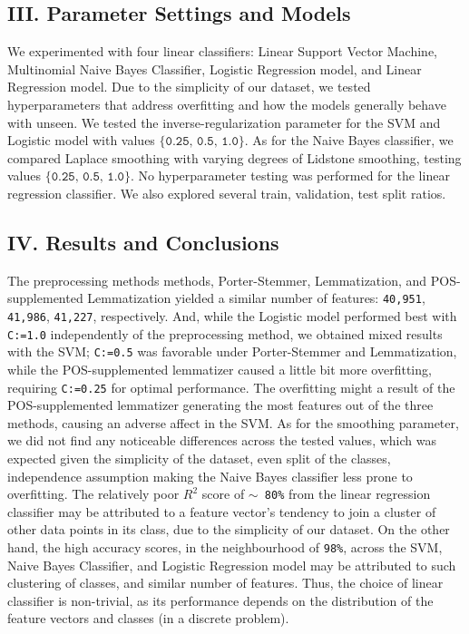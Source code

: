 \documentclass[11pt]{article}
\begin{document}
\subsection*{III. Parameter Settings and Models}
We experimented with four linear classifiers: 
Linear Support Vector Machine, 
Multinomial Naive Bayes Classifier, 
Logistic Regression model, 
and Linear Regression model. Due to the 
simplicity of our dataset, we tested hyperparameters
that address overfitting and
how the models generally behave with unseen.
We tested the inverse-regularization parameter
for the SVM and Logistic model with values $\{\texttt{0.25, 0.5, 1.0}\}$.
As for the Naive Bayes classifier, 
we compared Laplace smoothing 
with varying degrees of Lidstone smoothing,
testing values $\{\texttt{0.25, 0.5, 1.0}\}$. 
No hyperparameter testing was performed for the linear regression classifier.
We also explored several train, validation, test split ratios.

\subsection*{IV. Results and Conclusions}
The preprocessing methods methods, Porter-Stemmer, 
Lemmatization, and POS-supplemented Lemmatization
yielded a similar number of features: 
\texttt{40,951}, \texttt{41,986}, \texttt{41,227}, respectively.
And, while the Logistic model performed best with \texttt{C:=1.0} independently of
the preprocessing method, we obtained mixed results with the SVM;
\texttt{C:=0.5} was favorable under Porter-Stemmer and Lemmatization,
while the POS-supplemented lemmatizer caused a little bit more overfitting,
requiring \texttt{C:=0.25} for optimal performance. The overfitting might 
a result of the POS-supplemented lemmatizer generating the most features
out of the three methods, causing an adverse affect in the SVM.
As for the smoothing parameter, 
we did not find any noticeable differences across the tested values, 
which was expected given the simplicity of the dataset, even split of the classes,
independence assumption making the Naive Bayes classifier less prone 
to overfitting.
The relatively poor $R^2$ score of  \texttt{$\sim$ 80\%} from the linear regression classifier
may be attributed to a feature vector's tendency to join
a cluster of other data points in its class, due to the 
simplicity of our dataset.
On the other hand,
the high accuracy scores, in the neighbourhood of \texttt{98\%}, across the 
SVM, Naive Bayes Classifier, and Logistic Regression model may be attributed
to such clustering of classes, and similar number of features. 
Thus, the choice of linear classifier is non-trivial, as its 
performance depends on the distribution of the feature vectors and classes (in a discrete problem).
\end{document}
